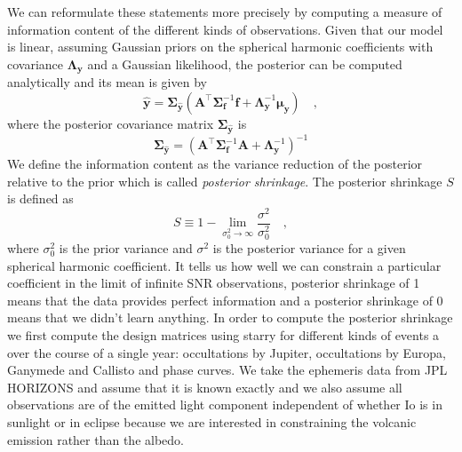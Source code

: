 \documentclass[modern]{aastex62}
\begin{document}
We can reformulate these statements more precisely by computing a measure of information content of the different kinds of observations.
Given that our model is linear, assuming Gaussian priors on the spherical harmonic coefficients with covariance $\boldsymbol{\Lambda}_\mathbf{y}$ and a Gaussian likelihood, the posterior can be computed analytically and its mean is given by
\begin{equation}
    \widehat{\mathbf{y}}=\boldsymbol{\Sigma}_{\hat{\mathbf{y}}}\left(\mathbf{A}^{\top} \boldsymbol{\Sigma}_{\mathbf{f}}^{-1} \mathbf{f}+\boldsymbol{\Lambda}_{\mathbf{y}}^{-1} \boldsymbol{\mu}_{\mathbf{y}}\right)
    \quad,
\end{equation}
where the posterior covariance matrix $\boldsymbol{\Sigma}_{\hat{\mathbf{y}}}$ is 
\begin{equation}
\boldsymbol{\Sigma}_{\hat{\mathbf{y}}}=\left( \mathbf{A}^{\top} \boldsymbol{\Sigma}_{\mathbf{f}}^{-1} \mathbf{A} +\boldsymbol{\Lambda}_{\mathbf{y}}^{-1}\right)^{-1}
\end{equation}
We define the information content as the variance reduction of the posterior relative to the prior which is called \emph{posterior shrinkage}.
The posterior shrinkage $S$ is defined as
\begin{equation}
S \equiv 1-\lim _{\sigma_{0}^{2} \rightarrow \infty} \frac{\sigma^{2}}{\sigma_{0}^{2}}
    \quad,
\end{equation}
where $\sigma^2_0$ is the prior variance and $\sigma^2$ is the posterior variance for a given spherical harmonic coefficient.
It tells us how well we can constrain a particular coefficient in the limit of infinite SNR observations, posterior shrinkage of 1 means that the data provides perfect information and a posterior shrinkage of 0 means that we didn't learn anything.
In order to compute the posterior shrinkage we first compute the design matrices using \textsf{starry} for different kinds of events a over the course of a single year: occultations by Jupiter, occultations by Europa, Ganymede and Callisto and phase curves.
We take the ephemeris data from \textsf{JPL HORIZONS} and assume that it is known exactly and we also assume all observations are of the emitted light component independent of whether Io is in sunlight or in eclipse because we are interested in constraining the volcanic emission rather than the albedo.
\end{document}
